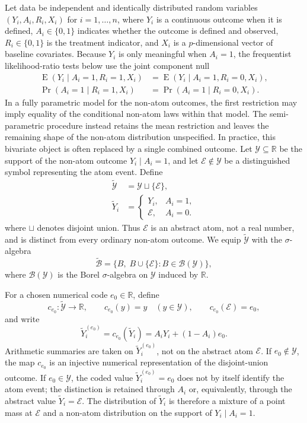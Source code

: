 \documentclass[11pt]{article}
\DeclareMathOperator*{\E}{E}
\begin{document}
Let data be independent and identically distributed random variables $(Y_i, A_i, R_i, X_i)$ for $i = 1, \ldots, n$, where $Y_i$ is a continuous outcome when it is defined, $A_i \in \{0,1\}$ indicates whether the outcome is defined and observed, $R_i \in \{0,1\}$ is the treatment indicator, and $X_i$ is a $p$-dimensional vector of baseline covariates. Because $Y_i$ is only meaningful when $A_i = 1$, the frequentist likelihood-ratio tests below use the joint component null
\begin{align*}
  \E(Y_i \mid A_i = 1, R_i = 1, X_i)
  &= \E(Y_i \mid A_i = 1, R_i = 0, X_i),\\
  \Pr(A_i = 1 \mid R_i = 1, X_i)
  &= \Pr(A_i = 1 \mid R_i = 0, X_i).
\end{align*}
In a fully parametric model for the non-atom outcomes, the first restriction may imply equality of the conditional non-atom laws within that model. The semi-parametric procedure instead retains the mean restriction and leaves the remaining shape of the non-atom distribution unspecified.
In practice, this bivariate object is often replaced by a single combined outcome. Let $\mathcal{Y}\subseteq\mathbb{R}$ be the support of the non-atom outcome $Y_i\mid A_i=1$, and let $\mathcal{E}\notin\mathcal{Y}$ be a distinguished symbol representing the atom event. Define
\begin{align*}
  \widetilde{\mathcal{Y}}
  &=
  \mathcal{Y}\sqcup\{\mathcal{E}\},\\
  \widetilde{Y}_i
  &=
  \begin{cases}
    Y_i, & A_i=1,\\
    \mathcal{E}, & A_i=0.
  \end{cases}
\end{align*}
where $\sqcup$ denotes disjoint union. Thus $\mathcal{E}$ is an abstract atom, not a real number, and is distinct from every ordinary non-atom outcome. We equip $\widetilde{\mathcal{Y}}$ with the $\sigma$-algebra
\[
  \widetilde{\mathcal{B}} = \{B,\; B \cup \{\mathcal{E}\} : B \in \mathcal{B}(\mathcal{Y})\},
\]
where $\mathcal{B}(\mathcal{Y})$ is the Borel $\sigma$-algebra on $\mathcal{Y}$ induced by $\mathbb{R}$.

For a chosen numerical code $e_0\in\mathbb{R}$, define
\[
  c_{e_0}:\widetilde{\mathcal{Y}}\to\mathbb{R},
  \qquad
  c_{e_0}(y)=y \quad (y\in\mathcal{Y}),
  \qquad
  c_{e_0}(\mathcal{E})=e_0,
\]
and write
\[
  \widetilde{Y}_i^{(e_0)}
  =c_{e_0}(\widetilde{Y}_i)
  =A_iY_i+(1-A_i)e_0.
\]
Arithmetic summaries are taken on $\widetilde{Y}_i^{(e_0)}$, not on the abstract atom $\mathcal{E}$. If $e_0\notin\mathcal{Y}$, the map $c_{e_0}$ is an injective numerical representation of the disjoint-union outcome. If $e_0\in\mathcal{Y}$, the coded value $\widetilde{Y}_i^{(e_0)}=e_0$ does not by itself identify the atom event; the distinction is retained through $A_i$ or, equivalently, through the abstract value $\widetilde{Y}_i=\mathcal{E}$. The distribution of $\widetilde{Y}_i$ is therefore a mixture of a point mass at $\mathcal{E}$ and a non-atom distribution on the support of $Y_i \mid A_i = 1$.
\end{document}
